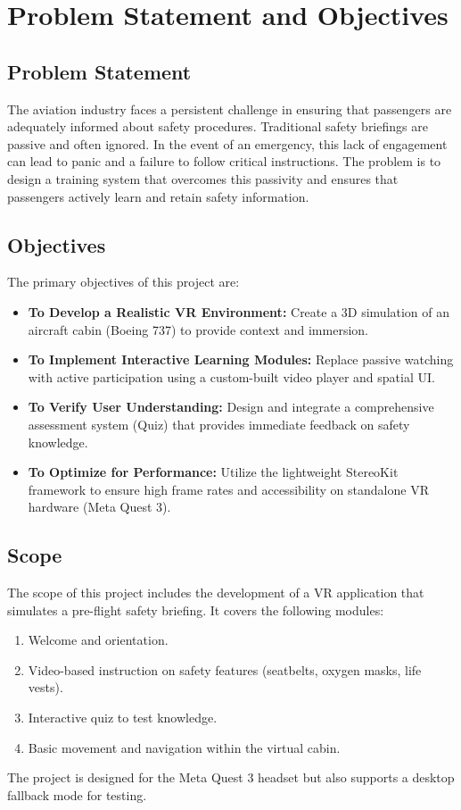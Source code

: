 \chapter{Problem Statement and Objectives}

\section{Problem Statement}
The aviation industry faces a persistent challenge in ensuring that passengers are adequately informed about safety procedures. Traditional safety briefings are passive and often ignored. In the event of an emergency, this lack of engagement can lead to panic and a failure to follow critical instructions. The problem is to design a training system that overcomes this passivity and ensures that passengers actively learn and retain safety information.

\section{Objectives}
The primary objectives of this project are:
\begin{itemize}
    \item \textbf{To Develop a Realistic VR Environment:} Create a 3D simulation of an aircraft cabin (Boeing 737) to provide context and immersion.
    \item \textbf{To Implement Interactive Learning Modules:} Replace passive watching with active participation using a custom-built video player and spatial UI.
    \item \textbf{To Verify User Understanding:} Design and integrate a comprehensive assessment system (Quiz) that provides immediate feedback on safety knowledge.
    \item \textbf{To Optimize for Performance:} Utilize the lightweight StereoKit framework to ensure high frame rates and accessibility on standalone VR hardware (Meta Quest 3).
\end{itemize}

\section{Scope}
The scope of this project includes the development of a VR application that simulates a pre-flight safety briefing. It covers the following modules:
\begin{enumerate}
    \item Welcome and orientation.
    \item Video-based instruction on safety features (seatbelts, oxygen masks, life vests).
    \item Interactive quiz to test knowledge.
    \item Basic movement and navigation within the virtual cabin.
\end{enumerate}
The project is designed for the Meta Quest 3 headset but also supports a desktop fallback mode for testing.
